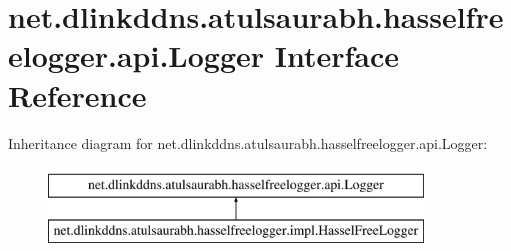 \hypertarget{interfacenet_1_1dlinkddns_1_1atulsaurabh_1_1hasselfreelogger_1_1api_1_1_logger}{}\section{net.\+dlinkddns.\+atulsaurabh.\+hasselfreelogger.\+api.\+Logger Interface Reference}
\label{interfacenet_1_1dlinkddns_1_1atulsaurabh_1_1hasselfreelogger_1_1api_1_1_logger}
Inheritance diagram for net.\+dlinkddns.\+atulsaurabh.\+hasselfreelogger.\+api.\+Logger\+:\begin{figure}[H]
\begin{center}
\leavevmode
\includegraphics[height=2.000000cm]{interfacenet_1_1dlinkddns_1_1atulsaurabh_1_1hasselfreelogger_1_1api_1_1_logger}
\end{center}
\end{figure}

